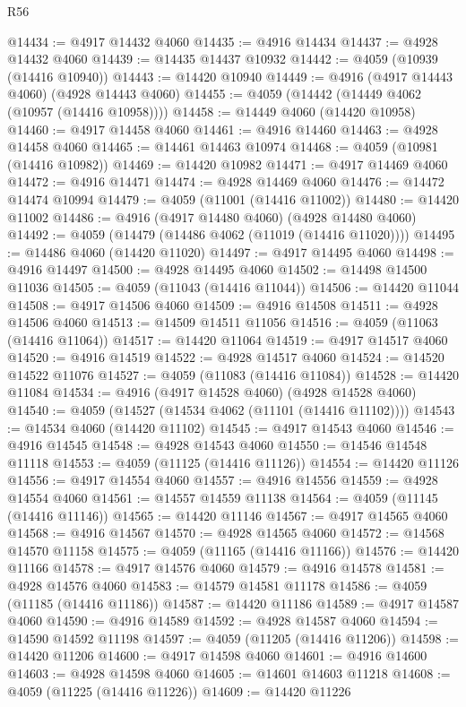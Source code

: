 \begin{lexlean}{R56}
\begin{coremodule}
@14434 := @4917 @14432 @4060
@14435 := @4916 @14434
@14437 := @4928 @14432 @4060
@14439 := @14435 @14437 @10932
@14442 := @4059 (@10939 (@14416 @10940))
@14443 := @14420 @10940
@14449 := @4916 (@4917 @14443 @4060) (@4928 @14443 @4060)
@14455 := @4059 (@14442 (@14449 @4062 (@10957 (@14416 @10958))))
@14458 := @14449 @4060 (@14420 @10958)
@14460 := @4917 @14458 @4060
@14461 := @4916 @14460
@14463 := @4928 @14458 @4060
@14465 := @14461 @14463 @10974
@14468 := @4059 (@10981 (@14416 @10982))
@14469 := @14420 @10982
@14471 := @4917 @14469 @4060
@14472 := @4916 @14471
@14474 := @4928 @14469 @4060
@14476 := @14472 @14474 @10994
@14479 := @4059 (@11001 (@14416 @11002))
@14480 := @14420 @11002
@14486 := @4916 (@4917 @14480 @4060) (@4928 @14480 @4060)
@14492 := @4059 (@14479 (@14486 @4062 (@11019 (@14416 @11020))))
@14495 := @14486 @4060 (@14420 @11020)
@14497 := @4917 @14495 @4060
@14498 := @4916 @14497
@14500 := @4928 @14495 @4060
@14502 := @14498 @14500 @11036
@14505 := @4059 (@11043 (@14416 @11044))
@14506 := @14420 @11044
@14508 := @4917 @14506 @4060
@14509 := @4916 @14508
@14511 := @4928 @14506 @4060
@14513 := @14509 @14511 @11056
@14516 := @4059 (@11063 (@14416 @11064))
@14517 := @14420 @11064
@14519 := @4917 @14517 @4060
@14520 := @4916 @14519
@14522 := @4928 @14517 @4060
@14524 := @14520 @14522 @11076
@14527 := @4059 (@11083 (@14416 @11084))
@14528 := @14420 @11084
@14534 := @4916 (@4917 @14528 @4060) (@4928 @14528 @4060)
@14540 := @4059 (@14527 (@14534 @4062 (@11101 (@14416 @11102))))
@14543 := @14534 @4060 (@14420 @11102)
@14545 := @4917 @14543 @4060
@14546 := @4916 @14545
@14548 := @4928 @14543 @4060
@14550 := @14546 @14548 @11118
@14553 := @4059 (@11125 (@14416 @11126))
@14554 := @14420 @11126
@14556 := @4917 @14554 @4060
@14557 := @4916 @14556
@14559 := @4928 @14554 @4060
@14561 := @14557 @14559 @11138
@14564 := @4059 (@11145 (@14416 @11146))
@14565 := @14420 @11146
@14567 := @4917 @14565 @4060
@14568 := @4916 @14567
@14570 := @4928 @14565 @4060
@14572 := @14568 @14570 @11158
@14575 := @4059 (@11165 (@14416 @11166))
@14576 := @14420 @11166
@14578 := @4917 @14576 @4060
@14579 := @4916 @14578
@14581 := @4928 @14576 @4060
@14583 := @14579 @14581 @11178
@14586 := @4059 (@11185 (@14416 @11186))
@14587 := @14420 @11186
@14589 := @4917 @14587 @4060
@14590 := @4916 @14589
@14592 := @4928 @14587 @4060
@14594 := @14590 @14592 @11198
@14597 := @4059 (@11205 (@14416 @11206))
@14598 := @14420 @11206
@14600 := @4917 @14598 @4060
@14601 := @4916 @14600
@14603 := @4928 @14598 @4060
@14605 := @14601 @14603 @11218
@14608 := @4059 (@11225 (@14416 @11226))
@14609 := @14420 @11226

\end{coremodule}
\end{lexlean}

